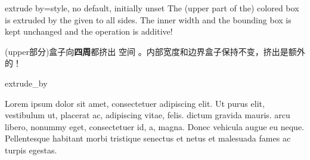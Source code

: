 \begin{docTcbKey}{extrude by}{=}{style, no default, initially unset}
The (upper part of the) colored box is extruded by the given  to all sides.
The inner width and the bounding box is kept unchanged and the operation
is additive!

(upper部分)盒子向{\bf 四周}都挤出  空间%
。内部宽度和边界盒子保持不变，挤出是额外的！
\begin{exdispExample}{extrude_by}

Lorem ipsum dolor sit amet, consectetuer adipiscing elit. Ut purus elit,
vestibulum ut, placerat ac, adipiscing vitae, felis.  dictum
gravida mauris. 
arcu libero, nonummy eget, consectetuer id,  a, magna. Donec
vehicula augue eu neque. Pellentesque habitant morbi tristique senectus et netus
et malesuada fames ac turpis egestas. 
\end{exdispExample}
\end{docTcbKey}